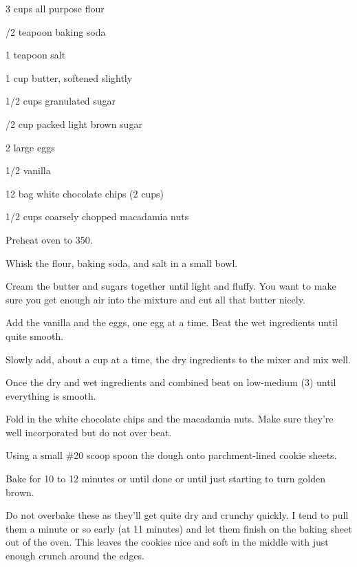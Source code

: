 %
%
%
%
\newpage



\begin{IngredientsAndSteps}
    \ListIngredientsAndSteps
    {
        3 cups all purpose flour

        /2 teapoon baking soda

        1 teapoon salt

        1 cup butter, softened slightly

        1/2 cups granulated sugar

        /2 cup packed light brown sugar

        2 large eggs

        1/2 \tsp vanilla

        12 \Ounce bag white chocolate chips (2 cups)

        1/2 cups coarsely chopped macadamia nuts
    }
    {
        Preheat oven to 350\Degrees[F].

        Whisk the flour, baking soda, and salt in a small bowl.

        Cream the butter and sugars together until light and fluffy. You want to make sure you get
        enough air into the mixture and cut all that butter nicely.

        Add the vanilla and the eggs, one egg at a time. Beat the wet ingredients until quite smooth.

        Slowly add, about a cup at a time, the dry ingredients to the mixer and mix well.

        Once the dry and wet ingredients and combined beat on low-medium (3) until
        everything is smooth.

        Fold in the white chocolate chips and the macadamia nuts. Make sure they're well
        incorporated but do not over beat.

        Using a small \#20 scoop spoon the dough onto parchment-lined cookie sheets.

        Bake for 10 to 12 minutes or until done or until just starting to turn golden brown.
    }
\end{IngredientsAndSteps}

\begin{ChefNotes}
    {Do not overbake these as they'll get quite dry and crunchy quickly. I tend to pull
        them a minute or so early (at 11 minutes) and let them finish on the baking sheet out of the oven.
        This leaves the cookies nice and soft in the middle with just enough crunch around the edges.}
\end{ChefNotes}
